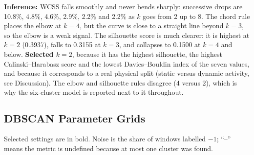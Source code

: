 \documentclass[12pt,a4paper]{article}
\begin{document}
\textbf{Inference:} WCSS falls smoothly and never bends sharply: successive drops are 10.8\%,
4.8\%, 4.6\%, 2.9\%, 2.2\% and 2.2\% as $k$ goes from 2 up to 8. The chord rule places the elbow at
$k=4$, but the curve is close to a straight line beyond $k=3$, so the elbow is a weak signal. The
silhouette score is much clearer: it is highest at $k=2$ (0.3937), falls to 0.3155 at $k=3$, and
collapses to 0.1500 at $k=4$ and below. \textbf{Selected $k = 2$}, because it has the highest
silhouette, the highest Calinski--Harabasz score and the lowest Davies--Bouldin index of the seven
values, and because it corresponds to a real physical split (static versus dynamic activity, see
Discussion). The elbow and silhouette rules disagree (4 versus 2), which is why the six-cluster
model is reported next to it throughout.

\subsection*{DBSCAN Parameter Grids}
Selected settings are in bold. Noise is the share of windows labelled $-1$; ``--'' means the
metric is undefined because at most one cluster was found.
\end{document}

